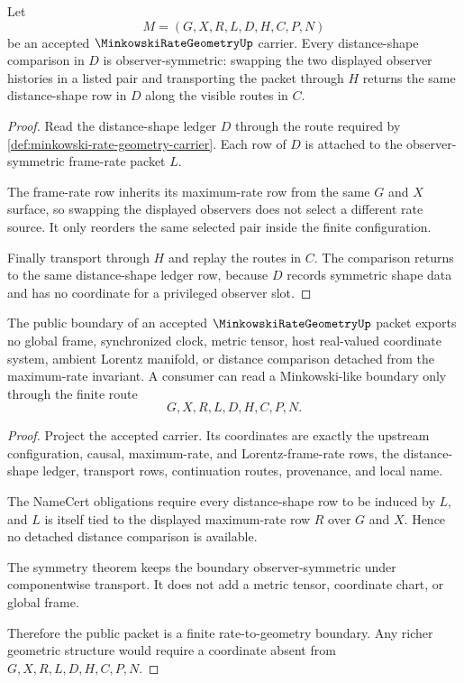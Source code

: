\begin{theorem}
\label{thm:minkowski-rate-geometry-symmetry}
Let
$$
M=(G,X,R,L,D,H,C,P,N)
$$
be an accepted $\MinkowskiRateGeometryUp$ carrier. Every distance-shape comparison in $D$ is observer-symmetric: swapping the two displayed observer histories in a listed pair and transporting the packet through $H$ returns the same distance-shape row in $D$ along the visible routes in $C$.
\end{theorem}
\begin{proof}
Read the distance-shape ledger $D$ through the route required by \autoref{def:minkowski-rate-geometry-carrier}. Each row of $D$ is attached to the observer-symmetric frame-rate packet $L$.

The frame-rate row inherits its maximum-rate row from the same $G$ and $X$ surface, so swapping the displayed observers does not select a different rate source. It only reorders the same selected pair inside the finite configuration.

Finally transport through $H$ and replay the routes in $C$. The comparison returns to the same distance-shape ledger row, because $D$ records symmetric shape data and has no coordinate for a privileged observer slot.
\end{proof}

\begin{theorem}
\label{thm:minkowski-rate-geometry-nonescape}
The public boundary of an accepted $\MinkowskiRateGeometryUp$ packet exports no global frame, synchronized clock, metric tensor, host real-valued coordinate system, ambient Lorentz manifold, or distance comparison detached from the maximum-rate invariant. A consumer can read a Minkowski-like boundary only through the finite route
$$
G,X,R,L,D,H,C,P,N.
$$
\end{theorem}
\begin{proof}
Project the accepted carrier. Its coordinates are exactly the upstream configuration, causal, maximum-rate, and Lorentz-frame-rate rows, the distance-shape ledger, transport rows, continuation routes, provenance, and local name.

The NameCert obligations require every distance-shape row to be induced by $L$, and $L$ is itself tied to the displayed maximum-rate row $R$ over $G$ and $X$. Hence no detached distance comparison is available.

The symmetry theorem keeps the boundary observer-symmetric under componentwise transport. It does not add a metric tensor, coordinate chart, or global frame.

Therefore the public packet is a finite rate-to-geometry boundary. Any richer geometric structure would require a coordinate absent from $G,X,R,L,D,H,C,P,N$.
\end{proof}

